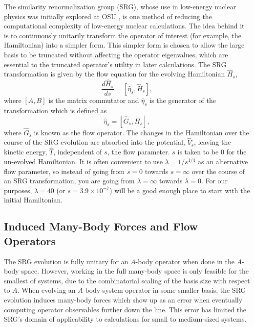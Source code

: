 The similarity renormalization group (SRG), whose use in low-energy nuclear physics was initially explored at OSU \cite{Jurgenson:2007td}, is one method of reducing the computational complexity of low-energy nuclear calculations. The idea behind it is to continuously unitarily transform the operator of interest (for example, the Hamiltonian) into a simpler form. This simpler form is chosen to allow the large basis to be truncated without affecting the operator eigenvalues, which are essential to the truncated operator's utility in later calculations. The SRG transformation is given by the flow equation for the evolving Hamiltonian $\hat{H}_s$,
\begin{equation}
\frac{d \hat{H}_s}{ds} = [\hat{\eta}_s, \hat{H}_s],
\end{equation}
where $[A, B]$ is the matrix commutator and $\hat{\eta}_s$ is the generator of the transformation which is defined as
\begin{equation}
\hat{\eta}_s = [\hat{G}_s, \hat{H}_s],
\end{equation}
where $\hat{G}_s$ is known as the flow operator. The changes in the Hamiltonian over the course of the SRG evolution are absorbed into the potential, $\hat{V}_s$, leaving the kinetic energy, $\hat{T}$, independent of $s$, the flow parameter. $s$ is taken to be 0 for the un-evolved Hamiltonian. It is often convenient to use $\lambda = 1 / s^{1/4}$ as an alternative flow parameter, so instead of going from $s=0$ towards $s=\infty$ over the course of an SRG transformation, you are going from $\lambda=\infty$ towards $\lambda=0$. For our purposes, $\lambda=40$ (or $s=3.9 \times 10^{-7}$) will be a good enough place to start with the initial Hamiltonian.

\subsection{Induced Many-Body Forces and Flow Operators}

The SRG evolution is fully unitary for an $A$-body operator when done in the $A$-body space. However, working in the full many-body space is only feasible for the smallest of systems, due to the combinatorial scaling of the basis size with respect to $A$. When evolving an $A$-body system operator in some smaller basis, the SRG evolution induces many-body forces which show up as an error when eventually computing operator observables further down the line. This error has limited the SRG's domain of applicability to calculations for small to medium-sized systems.

